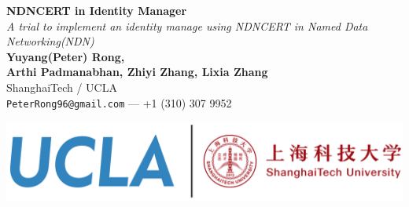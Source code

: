 \documentclass[a0,portrait]{poster}
\begin{document}


\begin{minipage}[b]{0.6\linewidth}
\veryHuge \color{NavyBlue} \textbf{NDNCERT in Identity Manager} \color{Black}\\ %
\Huge\textit{A trial to implement an identity manage using NDNCERT in Named Data Networking(NDN)}\\[2cm] %
\Large \textbf{Yuyang(Peter) Rong, \\ Arthi Padmanabhan, Zhiyi Zhang, Lixia Zhang}\\[0.5cm] %
\Large ShanghaiTech / UCLA \\ [0.4cm] %
\Large \texttt{PeterRong96@gmail.com} --- +1 (310) 307 9952\\
\end{minipage}
%
\begin{minipage}[b]{0.4\linewidth}
	\includegraphics[width=\linewidth]{figures/logo.png}\\
\end{minipage}

\vspace{0.7cm} %

\end{document}
